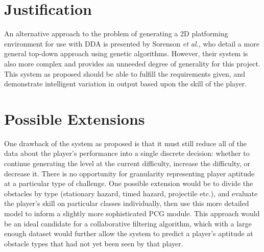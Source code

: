 \documentclass[a4paper,oneside,12pt,openany]{memoir}
\begin{document}
 \section{Justification}
An alternative approach to the problem of generating a 2D platforming environment for use with DDA is presented by Sorenson \emph{et al.}\cite{5940995}, who detail a more general top-down approach using genetic algorithms. However, their system is also more complex and provides an unneeded degree of generality for this project. This system as proposed should be able to fulfill the requirements given, and demonstrate intelligent variation in output based upon the skill of the player. 
 
\section{Possible Extensions}
One drawback of the system as proposed is that it must still reduce all of the data about the player's performance into a single discrete decision: whether to continue generating the level at the current difficulty, increase the difficulty, or decrease it. There is no opportunity for granularity representing player aptitude at a particular type of challenge. One possible extension would be to divide the obstacles by type (stationary hazard, timed hazard, projectile etc.), and evaluate the player's skill on particular classes individually, then use this more detailed model to inform a slightly more sophisticated PCG module. This approach would be an ideal candidate for a collaborative filtering algorithm, which with a large enough dataset would further allow the system to predict a player's aptitude at obstacle types that had not yet been seen by that player.

% 
% 
\end{document}
